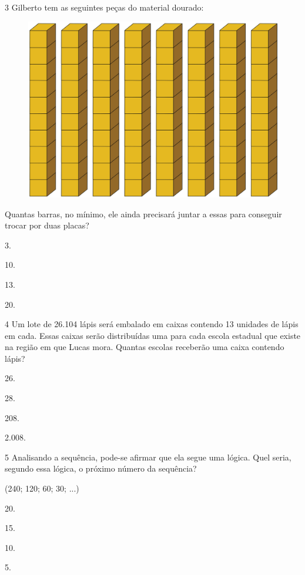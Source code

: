 \pagebreak
\num{3} Gilberto tem as seguintes peças do material dourado:

\begin{figure}[htpb!]
\centering
\includegraphics[width=.5\textwidth]{./media/image103.png}
\end{figure}

Quantas barras, no mínimo, ele ainda precisará juntar a essas para conseguir trocar por duas placas?

\begin{escolha}
\item
  3.
\item
  10.
\item
  13.
\item
  20.
\end{escolha}

\num{4} Um lote de 26.104 lápis será embalado em caixas contendo 13 unidades de
lápis em cada. Essas caixas serão distribuídas uma para cada escola
estadual que existe na região em que Lucas mora. Quantas escolas
receberão uma caixa contendo lápis?

\begin{escolha}
\item
  26.
\item
  28.
\item
  208.
\item
  2.008.
\end{escolha}

\pagebreak
\num{5} Analisando a sequência, pode-se afirmar que ela segue uma lógica. Quel seria, segundo essa lógica, o próximo número da sequência?

\begin{myquote}
(240; 120; 60; 30; ...)
\end{myquote}

\begin{multicols}{2}
\begin{escolha}
\item
  20.
\item
  15.
\item
  10.
\item
  5.
\end{escolha}
\end{multicols}


